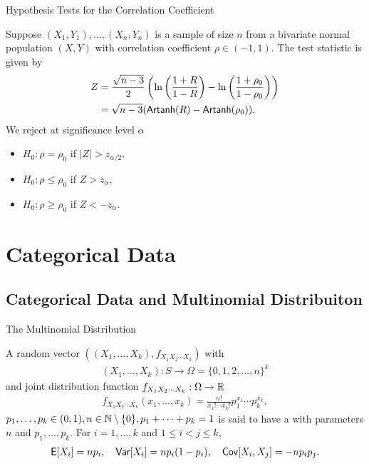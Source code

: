 \begin{frame}{Hypothesis Tests for the Correlation Coefficient}

\justifying
{} Suppose $(X_1, Y_1), \ldots, (X_n, Y_n)$ is a sample of size $n$ from a bivariate normal population $(X, Y)$ with correlation coefficient $\rho\in (-1, 1)$. The test statistic is given by
\begin{align*}
Z & = \frac{\sqrt{n-3}}{2}\left(\ln\left(\frac{1+R}{1-R} \right) - \ln\left(\frac{1+\rho_0}{1-\rho_0} \right) \right) \\
& = \sqrt{n-3}(\mathsf{Artanh}(R) - \mathsf{Artanh}(\rho_0)).
\end{align*}
We reject at significance level $\alpha$
\begin{itemize}
	\item $H_0: \rho = \rho_0$ if $|Z| > z_{\alpha/2}$,
	\item $H_0: \rho \leq \rho_0$ if $Z > z_{\alpha}$,
	\item $H_0: \rho \geq \rho_0$ if $Z < -z_{\alpha}$.
\end{itemize}


\end{frame}


\section{Categorical Data}


\subsection{Categorical Data and Multinomial Distribuiton}

\begin{frame}{The Multinomial Distribution}

\justifying
{} A random vector $((X_1, \ldots, X_k), f_{X_1X_2\cdots X_k})$ with 
\begin{align*}
(X_1, \ldots, X_k): S\rightarrow \Omega = \{0, 1, 2, \ldots, n\}^k
\end{align*}
and joint distribution function $f_{X_1X_2\cdots X_k}: \Omega\rightarrow\mathbb{R}$
\begin{align*}
f_{X_1X_2\cdots X_k}(x_1, \ldots, x_k) = \frac{n!}{x_1!\cdots x_k!} p_1^{x_1}\cdots p_k^{x_k},
\end{align*}
$p_1,\ldots, p_k\in (0, 1), n\in \mathbb{N}\setminus\{0\}, p_1 + \cdots + p_k = 1$ is said to have a  with parameters $n$ and $p_1,\ldots, p_k$. For $i = 1,\ldots, k$ and $1\leq i < j\leq k$,
\begin{align*}
\mathsf{E}[X_i] = np_i, \quad \mathsf{Var}[X_i] = np_i(1-p_i), \quad \mathsf{Cov}[X_i, X_j] = -np_ip_j.
\end{align*}

\end{frame}

